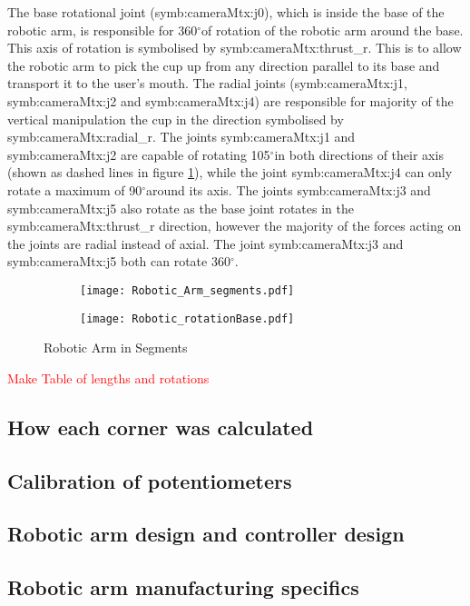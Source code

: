 \documentclass{article}
\newcommand{\rf}[1]{\textcolor{red}{#1}}
\newcommand{\sba}[1]{\gls{symb:cameraMtx:#1}}          %
\newcommand{\degrs}{\ensuremath{^{\circ}}}
\begin{document}
The base rotational joint (\sba{j0}), which is inside the base of the robotic arm, is responsible for 360\degrs of rotation of the robotic arm around the base.  This axis of rotation is symbolised by \sba{thrust_r}.  This is to allow the robotic arm to pick the cup up from any direction parallel to its base and transport it to the user's mouth.  The radial joints (\sba{j1}, \sba{j2} and \sba{j4}) are responsible for majority of the vertical manipulation the cup in the direction symbolised by \sba{radial_r}.  The joints \sba{j1} and \sba{j2} are capable of rotating 105\degrs in both directions of their axis (shown as dashed lines in figure \ref{fig:arm:basestruct}), while the joint \sba{j4} can only rotate a maximum of 90\degrs around its axis.  The joints \sba{j3} and \sba{j5} also rotate as the base joint rotates in the \sba{thrust_r} direction, however the majority of the forces acting on the joints are radial instead of axial.  The joint \sba{j3} and \sba{j5} both can rotate 360\degrs.  

\begin{figure}[h]
    \begin{subfigure}{0.5\textwidth}
        \texttt{[image: Robotic\_Arm\_segments.pdf]} 
    \end{subfigure}
    \begin{subfigure}{0.5\textwidth}
        \texttt{[image: Robotic\_rotationBase.pdf]} 
    \end{subfigure}
    \caption{Robotic Arm in Segments}
    \label{fig:arm:basestruct}
\end{figure}



\rf{Make Table of lengths and rotations}


\subsection{How each corner was calculated}
\subsection{Calibration of potentiometers}
\subsection{Robotic arm design and controller design}
\subsection{Robotic arm manufacturing specifics}
\end{document}
